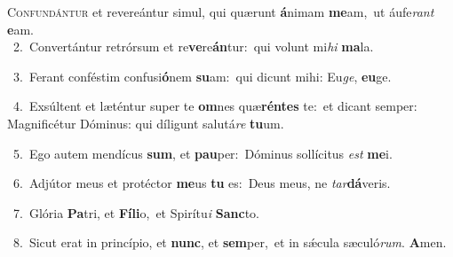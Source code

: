 \lettrine{\initial\textcolor{\initialcolor}{C}}{onfundántur} et revereántur simul, qui quærunt \textbf{á}\-nimam \textbf{me}\-am,~\star ut áufe\textit{rant} \textbf{e}\-am.\\
{\numbfont\textcolor{\numbcolor}{~2.}}~Convertántur retrórsum et re\-\textbf{ve}\-re\-\textbf{án}\-tur:~\star qui volunt mi\textit{hi} \textbf{ma}\-la.\par
{\numbfont\textcolor{\numbcolor}{~3.}}~Ferant conféstim confusi\-\textbf{ó}\-nem \textbf{su}\-am:~\star qui dicunt mihi: Eu\-\textit{ge}\-, \textbf{eu}\-ge.\par
{\numbfont\textcolor{\numbcolor}{~4.}}~Exsúltent et læténtur super te \textbf{om}\-nes quæ\-\textbf{rén}\-\textbf{tes} te:~\star et dicant semper: Magnificétur Dóminus: qui díligunt salutá\textit{re} \textbf{tu}\-um.\par
{\numbfont\textcolor{\numbcolor}{~5.}}~Ego autem mendícus \textbf{sum}\-, et \textbf{pau}\-per:~\star Dóminus sollícitus \textit{est} \textbf{me}\-i.\par
{\numbfont\textcolor{\numbcolor}{~6.}}~Adjútor meus et protéctor \textbf{me}\-us \textbf{tu} es:~\star Deus meus, ne \textit{tar}\-\textbf{dá}veris.\par
{\numbfont\textcolor{\numbcolor}{~7.}}~Glória \textbf{Pa}\-tri, et \textbf{Fí}\-\textbf{li}o,~\star et Spirítu\textit{i} \textbf{Sanc}\-to.\par
{\numbfont\textcolor{\numbcolor}{~8.}}~Sicut erat in princípio, et \textbf{nunc}\-, et \textbf{sem}\-per,~\star et in sǽcula sæculó\-\textit{rum}\-. \textbf{A}\-men.\par
